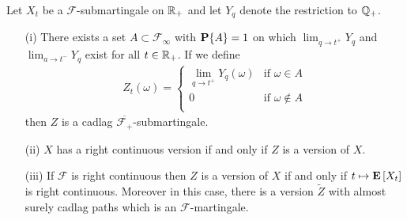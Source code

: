\begin{thm}\label{CadlagModificationContinuousMartingale}Let $X_t$  be a $\mathcal{F}$-submartingale on $\mathbb{R}_+$
  and let $Y_q$ denote the restriction to $\mathbb{Q}_+$.  
\begin{itemize}
\item[(i)]There
  exists a set $A \subset \mathcal{F}_\infty$ with $\textbf{P}\{A\}=1$ on which
  $\lim_{q \to t^+} Y_q$ and $\lim_{a \to t^-} Y_q$ exist for all $t
  \in \mathbb{R}_+$.  If we
  define 
\begin{align*}
Z_t(\omega) = 
\begin{cases}
\lim_{q \to t^+} Y_q(\omega) & \text{if $\omega \in A$} \\
0 & \text{if $\omega \notin A$} \\
\end{cases}
\end{align*} 
then $Z$ is a cadlag
  $\overline{\mathcal{F}_+}$-submartingale.
\item[(ii)]$X$ has a right
continuous version if and only if $Z$ is a version of $X$.
\item[(iii)]If $\mathcal{F}$ is right continuous then $Z$ is a version of $X$ if and only if $t \mapsto
\textbf{E}\left[X_t\right]$ is right continuous.  Moreover in this case, there
is a version $\tilde{Z}$ with almost surely cadlag paths which is an $\mathcal{F}$-martingale.
\end{itemize}
\end{thm}
